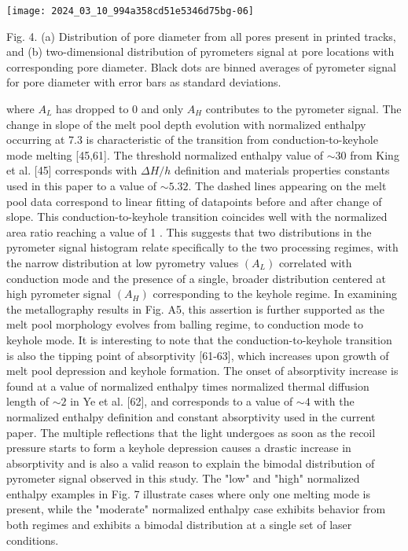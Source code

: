 \documentclass[10pt]{article}
\begin{document}
\begin{center}
\texttt{[image: 2024\_03\_10\_994a358cd51e5346d75bg-06]}
\end{center}

Fig. 4. (a) Distribution of pore diameter from all pores present in printed tracks, and (b) two-dimensional distribution of pyrometers signal at pore locations with corresponding pore diameter. Black dots are binned averages of pyrometer signal for pore diameter with error bars as standard deviations.

where $A_{L}$ has dropped to 0 and only $A_{H}$ contributes to the pyrometer signal. The change in slope of the melt pool depth evolution with normalized enthalpy occurring at 7.3 is characteristic of the transition from conduction-to-keyhole mode melting [45,61]. The threshold normalized enthalpy value of $\sim 30$ from King et al. [45] corresponds with $\Delta H / h$ definition and materials properties constants used in this paper to a value of $\sim 5.32$. The dashed lines appearing on the melt pool data correspond to linear fitting of datapoints before and after change of slope. This conduction-to-keyhole transition coincides well with the normalized area ratio reaching a value of 1 . This suggests that two distributions in the pyrometer signal histogram relate specifically to the two processing regimes, with the narrow distribution at low pyrometry values $\left(A_{L}\right)$ correlated with conduction mode and the presence of a single, broader distribution centered at high pyrometer signal $\left(A_{H}\right)$ corresponding to the keyhole regime. In examining the metallography results in Fig. A5, this assertion is further supported as the melt pool morphology evolves from balling regime, to conduction mode to keyhole mode. It is interesting to note that the conduction-to-keyhole transition is also the tipping point of absorptivity [61-63], which increases upon growth of melt pool depression and keyhole formation. The onset of absorptivity increase is found at a value of normalized enthalpy times normalized thermal diffusion length of $\sim 2$ in Ye et al. [62], and corresponds to a value of $\sim 4$ with the normalized enthalpy definition and constant absorptivity used in the current paper. The multiple reflections that the light undergoes as soon as the recoil pressure starts to form a keyhole depression causes a drastic increase in absorptivity and is also a valid reason to explain the bimodal distribution of pyrometer signal observed in this study. The "low" and "high" normalized enthalpy examples in Fig. 7 illustrate cases where only one melting mode is present, while the "moderate" normalized enthalpy case exhibits behavior from both regimes and exhibits a bimodal distribution at a single set of laser conditions.
\end{document}
